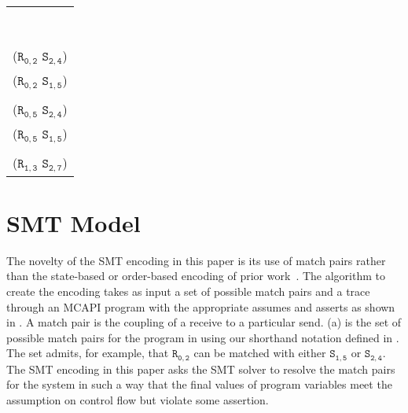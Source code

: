\newsavebox{\boxMP}
\begin{lrbox}{\boxMP}
\normalsize
\begin{tabular}[t]{l}
\\\\\\\\\\\\\\\\\\
($\mathtt{R_{0,2}}$ $\mathtt{S_{2,4}}$)\\
($\mathtt{R_{0,2}}$ $\mathtt{S_{1,5}}$)\\
\\
($\mathtt{R_{0,5}}$ $\mathtt{S_{2,4}}$)\\
($\mathtt{R_{0,5}}$ $\mathtt{S_{1,5}}$)\\
\\
($\mathtt{R_{1,3}}$ $\mathtt{S_{2,7}}$)\\
\end{tabular}
\end{lrbox}




\section{SMT Model}\label{sec:smt}


The novelty of the SMT encoding in this paper is its use of match pairs rather than the state-based or order-based encoding of prior work~\cite{elwakil:padtad10,elwakil:atva10}. The algorithm to create the encoding takes as input a set of possible match pairs and a trace through an MCAPI program with the appropriate assumes and asserts as shown in . A match pair is the coupling of a receive to a particular send. (a) is the set of possible match pairs for the program in  using our shorthand notation defined in . The set admits, for example, that $\mathtt{R_{0,2}}$ can be matched with either $\mathtt{S_{1,5}}$ or $\mathtt{S_{2,4}}$. The SMT encoding in this paper asks the SMT solver to resolve the match pairs for the system in such a way that the final values of program variables meet the assumption on control flow but violate some assertion.

